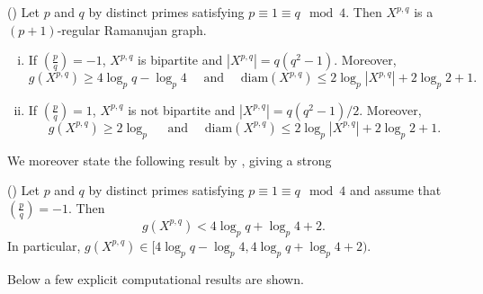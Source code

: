 \begin{theorem}(\cite{LubotzkyPhillipsSarnak1988})
	Let $p$ and $q$ by distinct primes satisfying $p \equiv 1 \equiv q \mod 4$. Then $X^{p,q}$ is a $(p+1)$-regular Ramanujan graph. 
	\begin{enumerate}[(i)]
		\item If $\genfrac{(}{)}{}{}{p}{q} = -1$, $X^{p,q}$ is bipartite and $|X^{p,q}| = q(q^2 -1)$. Moreover, $$g(X^{p,q}) \geq 4 \log_p q - \log_p 4 \quad \text{ and } \quad \mathrm{diam}(X^{p,q}) \leq 2 \log_p |X^{p,q}| + 2 \log_p 2 + 1.$$
		\item If $\genfrac{(}{)}{}{}{p}{q} = 1$, $X^{p,q}$ is not bipartite and $|X^{p,q}| = q(q^2 -1)/2$. Moreover, $$g(X^{p,q}) \geq 2 \log_p  \quad \text{ and } \quad \mathrm{diam}(X^{p,q}) \leq 2 \log_p |X^{p,q}| + 2 \log_p 2 + 1.$$
	\end{enumerate}
\end{theorem}

We moreover state the following result by \cite{BiggsBoshier1990}, giving a strong 

\begin{theorem}(\cite{BiggsBoshier1990})
	Let $p$ and $q$ by distinct primes satisfying $p \equiv 1 \equiv q \mod 4$ and assume that $\genfrac{(}{)}{}{}{p}{q} = -1$. Then $$g(X^{p,q}) < 4 \log_p q + \log_p 4 + 2. $$ In particular, $g(X^{p,q}) \in [4 \log_p q - \log_p 4 , 4 \log_p q + \log_p 4 + 2)$.
\end{theorem}

Below a few explicit computational results are shown.

